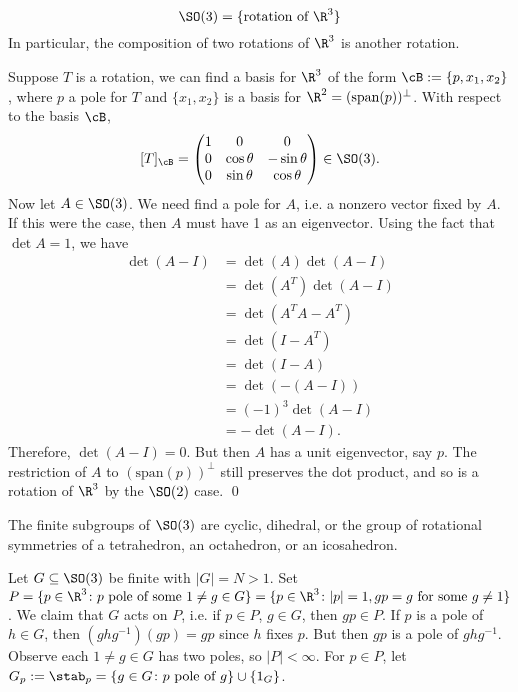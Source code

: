 \begin{thm}
	\[
	\SO(3)= \{\text{rotation of }\R^3\}
	\]
In particular, the composition of two rotations of $\R^3$ is another rotation.
\end{thm}

\pf Suppose $T$ is a rotation, we can find a basis for $\R^3$ of the form $\cB:=\{p,x_1,x_2\}$, where $p$ a pole for $T$ and $\{x_1, x_2\}$ is a basis for $\R^2= (\text{span}(p))^\perp$. With respect to the basis $\cB$, 
	\[
	[T]_\cB= 
	\begin{pmatrix}
	1 & 0 & 0 \\
	0 & \cos \theta & -\sin \theta \\
	0 & \sin \theta & \cos \theta
	\end{pmatrix} \in \SO(3).
	\]
Now let $A \in \SO(3)$. We need find a pole for $A$, i.e. a nonzero vector fixed by $A$. If this were the case, then $A$ must have 1 as an eigenvector. Using the fact that $\det A=1$, we have
	\[
	\begin{split}
	\det(A-I)&= \det(A)\det(A-I) \\
	&=\det(A^T)\det(A-I) \\
	&= \det(A^TA-A^T) \\
	&=\det(I-A^T) \\
	&=\det(I-A) \\
	&= \det(-(A-I)) \\
	&= (-1)^3 \det(A-I) \\
	&= - \det(A-I).
	\end{split}
	\]
Therefore, $\det(A-I)=0$. But then $A$ has a unit eigenvector, say $p$. The restriction of $A$ to $(\text{span}(p))^\perp$ still preserves the dot product, and so is a rotation of $\R^3$ by the $\SO(2)$ case. \qed \\


\begin{thm}
The finite subgroups of $\SO(3)$ are cyclic, dihedral, or the group of rotational symmetries of a tetrahedron, an octahedron, or an icosahedron. 
\end{thm}

\pf Let $G \subseteq \SO(3)$ be finite with $|G|=N>1$. Set $P=\{p \in \R^3 \colon p \text{ pole of some }1\neq g \in G\}= \{ p \in \R^3 \colon |p|=1, gp=g \text{ for some }g\neq 1\}$. We claim that $G$ acts on $P$, i.e. if $p \in P$, $g \in G$, then $gp \in P$. If $p$ is a pole of $h \in G$, then $(ghg^{-1})(gp)=gp$ since $h$ fixes $p$. But then $gp$ is a pole of $ghg^{-1}$. Observe each $1 \neq g \in G$ has two poles, so $|P|<\infty$. For $p \in P$, let $G_p:= \stab_p=\{g \in G \colon p \text{ pole of }g\} \cup \{1_G\}$. 

